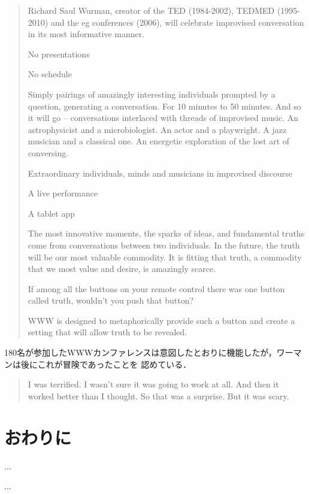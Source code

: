 \documentclass[submit,techreq,jkeyword,noauthor]{ipsj}
\begin{document}
\begin{quote}
Richard Saul Wurman, creator of the TED (1984-2002), TEDMED (1995-2010) and the eg 
conferences (2006), will celebrate improvised conversation in its most informative manner.

No presentations

No schedule

Simply pairings of amazingly interesting individuals prompted by a question, generating a 
conversation. For 10 minutes to 50 minutes. And so it will go – conversations interlaced 
with threads of improvised music. An astrophysicist and a microbiologist. An actor and a 
playwright. A jazz musician and a classical one. An energetic exploration of the lost art 
of conversing.

Extraordinary individuals,
minds and musicians in improvised discourse

A live performance

A tablet app

The most innovative moments, the sparks of ideas, and fundamental truths come from 
conversations between two individuals.
In the future, the truth will be our most valuable commodity. It is fitting that truth, 
a commodity that we most value and desire, is amazingly scarce.

If among all the buttons on your remote control there was one button called truth, 
wouldn't you push that button?

WWW is designed to metaphorically provide such a button and create a setting that 
will allow truth to be revealed.	
\end{quote}

180名が参加したWWWカンファレンスは意図したとおりに機能したが，ワーマンは後にこれが冒険であったことを
認めている．\cite{ek}

\begin{quote}
I was terrified. I wasn't sure it was going to work at all. And then it worked better 
than I thought. So that was a surprise. But it was scary.
\end{quote}



\section{おわりに}

...

\begin{acknowledgment}
...
\end{acknowledgment}
\end{document}
